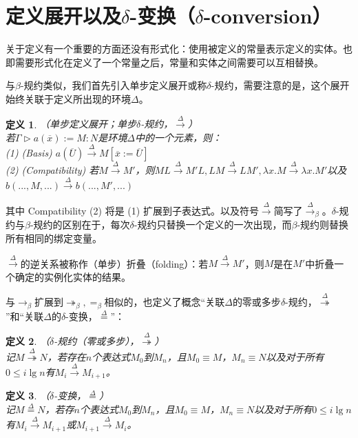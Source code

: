 \documentclass[UTF8]{article}
\newtheorem{thm}{定义}[section]
\begin{document}
	\section{定义展开以及$\delta$-变换（$\delta$-conversion）}
	\noindent
	关于定义有一个重要的方面还没有形式化：使用被定义的常量表示定义的实体。也即需要形式化在定义了一个常量之后，常量和实体之间需要可以互相替换。
		
		与$\beta$-规约类似，我们首先引入单步定义展开或称$\delta$-规约，需要注意的是，这个展开始终关联于定义所出现的环境$\Delta$。
		
		\begin{thm}（单步定义展开；单步$\delta$-规约，$\stackrel{\Delta}{\rightarrow}$）\\
			若$\Gamma\triangleright a(\overline{x}):=M:N$是环境$\Delta$中的一个元素，则：\\
			(1) (Basis) $a(\overline{U})\stackrel{\Delta}{\rightarrow}M\left[\overline{x}:=\overline{U}\right]$\\
			(2) (Compatibility) 若$M\stackrel{\Delta}{\rightarrow}M'$，则$ML\stackrel{\Delta}{\rightarrow}M'L,LM\stackrel{\Delta}{\rightarrow}LM',\lambda x.M\stackrel{\Delta}{\rightarrow}\lambda x.M'$以及$b(...,M,...)\stackrel{\Delta}{\rightarrow}b(...,M',...)$
		\end{thm}
	
		其中 Compatibility (2) 将是 (1) 扩展到子表达式。以及符号$\stackrel{\Delta}{\rightarrow}$简写了$\stackrel{\Delta}{\rightarrow}_\beta$。$\delta$-规约与$\beta$-规约的区别在于，每次$\delta$-规约只替换一个定义的一次出现，而$\beta$-规约则替换所有相同的绑定变量。
		
		$\stackrel{\Delta}{\rightarrow}$的逆关系被称作（单步）折叠（folding）：若$M\stackrel{\Delta}{\rightarrow}M'$，则$M$是在$M'$中折叠一个确定的实例化实体的结果。
		
		与$\rightarrow_\beta$扩展到$\twoheadrightarrow_\beta,=_\beta$相似的，也定义了概念“关联$\Delta$的零或多步$\delta$-规约，$\stackrel{\Delta}{\twoheadrightarrow}$”和“关联$\Delta$的$\delta$-变换，$\stackrel{\Delta}{=}$”：
		
		\begin{thm}（$\delta$-规约（零或多步），$\stackrel{\Delta}{\twoheadrightarrow}$）\\
			记$M\stackrel{\Delta}{\twoheadrightarrow}N$，若存在$n$个表达式$M_0$到$M_n$，且$M_0\equiv M$，$M_n\equiv N$以及对于所有$0\le i\lg n$有$M_i\stackrel{\Delta}{\rightarrow}M_{i+1}$。
		\end{thm}
	
		\begin{thm}（$\delta$-变换，$\stackrel{\Delta}{=}$）\\
			记$M\stackrel{\Delta}{=}N$，若存$n$个表达式$M_0$到$M_n$，且$M_0\equiv M$，$M_n\equiv N$以及对于所有$0\le i\lg n$有$M_i\stackrel{\Delta}{\rightarrow}M_{i+1}$或$M_{i+1}\stackrel{\Delta}{\rightarrow}M_i$。
		\end{thm}
	
\end{document}
